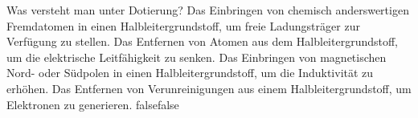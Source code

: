     {Was versteht man unter Dotierung?}
    {Das Einbringen von chemisch anderswertigen Fremdatomen in einen Halbleitergrundstoff, um freie Ladungsträger zur Verfügung zu stellen.}
    {Das Entfernen von Atomen aus dem Halbleitergrundstoff, um die elektrische Leitfähigkeit zu senken.}
    {Das Einbringen von magnetischen Nord- oder Südpolen in einen Halbleitergrundstoff, um die Induktivität zu erhöhen.}
    {Das Entfernen von Verunreinigungen aus einem Halbleitergrundstoff, um Elektronen zu generieren.}
    {false}{false}